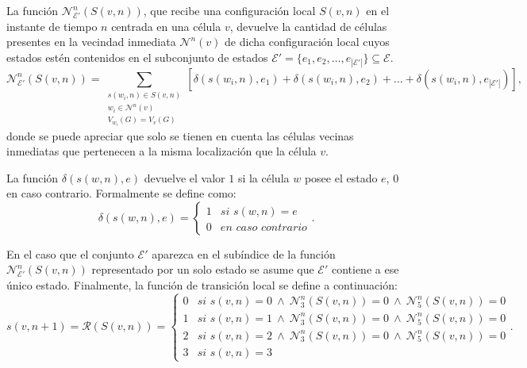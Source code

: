 \begin{definition}
\label{def-near-neighbours}
La funci\'on $\mathcal{N}_{\mathcal{E'}}^n(S(v,n))$, que recibe una configuraci\'on local $S(v,n)$ en el instante de tiempo $n$ centrada en una c\'elula $v$, devuelve la cantidad de c\'elulas presentes en la vecindad inmediata $\mathcal{N}^{n}(v)$ de dicha configuraci\'on local cuyos estados est\'en contenidos en el subconjunto de estados $\mathcal{E'} = \lbrace e_1, e_2, \ldots , e_{|\mathcal{E'}|}\rbrace \subseteq \mathcal{E}$.
\begin{equation}
\mathcal{N}_{\mathcal{E'}}^n(S(v,n)) = \sum_{\substack{{s(w_i,n) \in S(v,n)}\\{w_i \in \mathcal{N}^{n}(v)}\\{V_{w_i}(G)=V_v(G)}}} \left[\delta(s(w_i,n),e_1) + \delta(s(w_i,n),e_2) + \ldots + \delta(s(w_i,n),e_{|\mathcal{E'}|}) \right], \label{eq-near-neighbours}
\end{equation}
donde se puede apreciar que solo se tienen en cuenta las c\'elulas vecinas inmediatas que pertenecen a la misma localizaci\'on que la c\'elula $v$. 
\end{definition}

\begin{definition}
\label{def-delta}
La funci\'on $\delta(s(w,n),e)$ devuelve el valor $1$ si la c\'elula $w$ posee el estado $e$, $0$ en caso contrario. Formalmente se define como:
\begin{equation}
\delta(s(w,n),e)=\left\lbrace
	\begin{array}{ll}
		1& \textit{si } s(w,n)=e \\
		0& \textit{en caso contrario}
	\end{array}
\right.. 
\end{equation}
\end{definition}

En el caso que el conjunto $\mathcal{E'}$ aparezca en el sub\'indice de la funci\'on $\mathcal{N}_{\mathcal{E'}}^n(S(v,n))$ representado por un solo estado se asume que $\mathcal{E'}$ contiene a ese \'unico estado. Finalmente, la funci\'on de transici\'on local se define a continuaci\'on:
\begin{equation}
s(v,n+1)=\mathcal{R}(S(v,n))=\left\lbrace
	\begin{array}{ll}
		0& \textit{si } s(v,n)=0~\wedge~\mathcal{N}_3^n(S(v,n))=0~\wedge~\mathcal{N}_5^n(S(v,n))=0 \\
		1& \textit{si } s(v,n)=1~\wedge~\mathcal{N}_3^n(S(v,n))=0~\wedge~\mathcal{N}_5^n(S(v,n))=0 \\
		2& \textit{si } s(v,n)=2~\wedge~\mathcal{N}_3^n(S(v,n))=0~\wedge~\mathcal{N}_5^n(S(v,n))=0 \\
		3& \textit{si } s(v,n)=3 
	\end{array}
\right.. \label{eq-inert}
\end{equation}

